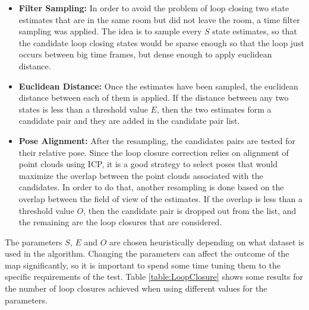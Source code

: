 \documentclass[11pt]{article}
\begin{document}
\begin{itemize}
\item \textbf{Filter Sampling:} In order to avoid the problem of loop closing two state estimates that are in the same room but did not leave the room, a time filter sampling was applied. The idea is to sample every $S$ state estimates, so that the candidate loop closing states would be sparse enough so that the loop just occurs between big time frames, but dense enough to apply euclidean distance.
\item \textbf{Euclidean Distance:} Once the estimates have been  sampled, the euclidean distance between each of them is applied. If the distance between any two states is less than a threshold value $E$, then the two estimates form a candidate pair and they are added in the candidate pair list.
\item \textbf{Pose Alignment:} After the resampling, the candidates pairs are tested for their relative pose. Since the loop closure correction relies on alignment of point clouds using ICP, it is a good strategy to select poses that would maximize the overlap between the point clouds associated with the candidates. In order to do that, another resampling is done based on the overlap between the field of view of the estimates. If the overlap is less than a threshold value $O$, then the candidate pair is dropped out from the list, and the remaining are the loop closures that are considered.
\end{itemize}
	
The parameters $S$, $E$ and $O$ are chosen heuristically depending on what dataset is used in the algorithm. Changing the parameters can affect the outcome of the map significantly, so it is important to spend some time tuning them to the specific requirements of the test. Table \ref{table:LoopClosure} shows some results for the number of loop closures achieved when using different values for the parameters.
\end{document}
